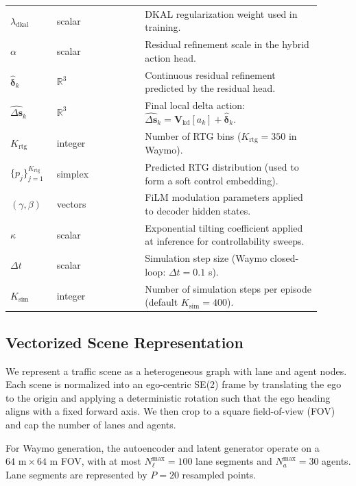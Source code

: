 \documentclass{article}
\theoremstyle{plain}
\theoremstyle{definition}
\theoremstyle{remark}
\begin{document}
\begin{table}[t]
\begin{tabular}{p{0.12\linewidth}p{0.26\linewidth}p{0.52\linewidth}}
\(\lambda_{\mathrm{dkal}}\) & scalar & DKAL regularization weight used in training. \\
\(\alpha\) & scalar & Residual refinement scale in the hybrid action head. \\
\(\widehat{\boldsymbol{\delta}}_k\) & \(\mathbb{R}^{3}\) & Continuous residual refinement predicted by the residual head. \\
\(\widehat{\Delta\mathbf{s}}_k\) & \(\mathbb{R}^{3}\) & Final local delta action: \(\widehat{\Delta\mathbf{s}}_k=\mathbf{V}_{\mathrm{kd}}[a_k]+\widehat{\boldsymbol{\delta}}_k\). \\
\(K_{\mathrm{rtg}}\) & integer & Number of RTG bins (\(K_{\mathrm{rtg}}{=}350\) in Waymo). \\
\(\{p_j\}_{j=1}^{K_{\mathrm{rtg}}}\) & simplex & Predicted RTG distribution (used to form a soft control embedding). \\
\((\gamma,\beta)\) & vectors & FiLM modulation parameters applied to decoder hidden states. \\
\(\kappa\) & scalar & Exponential tilting coefficient applied at inference for controllability sweeps. \\
\(\Delta t\) & scalar & Simulation step size (Waymo closed-loop: \(\Delta t{=}0.1\) s). \\
\(K_{\mathrm{sim}}\) & integer & Number of simulation steps per episode (default \(K_{\mathrm{sim}}{=}400\)). \\
\bottomrule
\end{tabular}
\end{table}


\subsection{Vectorized Scene Representation}
\label{app:representation}

We represent a traffic scene as a heterogeneous graph with lane and agent nodes. Each scene is normalized into an ego-centric
SE(2) frame by translating the ego to the origin and applying a deterministic rotation such that the ego heading aligns with a
fixed forward axis. We then crop to a square field-of-view (FOV) and cap the number of lanes and agents.

For Waymo generation, the autoencoder and latent generator operate on a \(64\text{ m}\times 64\text{ m}\) FOV, with at most
\(N_{\ell}^{\max}{=}100\) lane segments and \(N_{a}^{\max}{=}30\) agents. Lane segments are represented by \(P{=}20\) resampled points.
\end{document}
